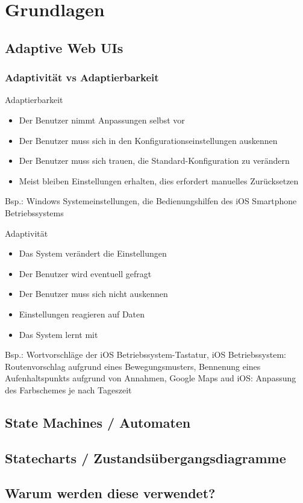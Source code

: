 \chapter{Grundlagen}

\section{Adaptive Web UIs}

\subsection{Adaptivität vs Adaptierbarkeit}
Adaptierbarkeit
\begin{itemize}
    \item Der Benutzer nimmt Anpassungen selbst vor
    \item Der Benutzer muss sich in den Konfigurationseinstellungen auskennen
    \item Der Benutzer muss sich trauen, die Standard-Konfiguration zu verändern
    \item Meist bleiben Einstellungen erhalten, dies erfordert manuelles Zurücksetzen
\end{itemize}
Bsp.: Windows Systemeinstellungen, die Bedienungshilfen des iOS Smartphone Betriebssystems

Adaptivität
\begin{itemize}
    \item Das System verändert die Einstellungen
    \item Der Benutzer wird eventuell gefragt
    \item Der Benutzer muss sich nicht auskennen
    \item Einstellungen reagieren auf Daten
    \item Das System lernt mit
\end{itemize}
Bsp.: Wortvorschläge der iOS Betriebssystem-Tastatur, iOS Betriebssystem: Routenvorschlag
aufgrund eines Bewegungsmusters, Bennenung eines Aufenhaltspunkts aufgrund von Annahmen, Google Maps aud iOS: Anpassung des
Farbschemes je nach Tageszeit


\section{State Machines / Automaten}

\section{Statecharts / Zustandsübergangsdiagramme}

\section{Warum werden diese verwendet?}